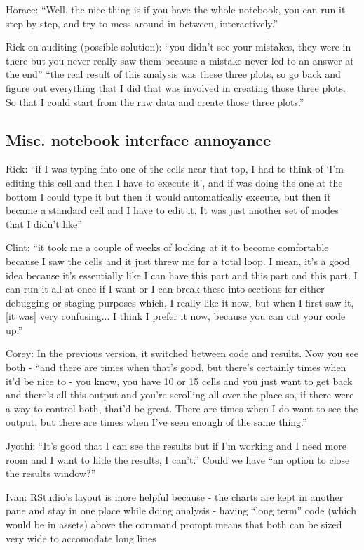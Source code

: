 Horace: ``Well, the nice thing is if you have the whole notebook, you can run it
step by step, and try to mess around in between, interactively.''

Rick on auditing (possible solution): ``you didn't see your mistakes, they were
in there but you never really saw them because a mistake never led to an answer
at the end'' ``the real result of this analysis was these three plots, so go
back and figure out everything that I did that was involved in creating those
three plots. So that I could start from the raw data and create those three
plots.''


\subsection{Misc. notebook interface annoyance}
Rick: ``if I was typing into one of the cells near that top, I had to think of
`I'm editing this cell and then I have to execute it', and if was doing the one
at the bottom I could type it but then it would automatically execute, but then
it became a standard cell and I have to edit it. It was just another set of
modes that I didn't like''

Clint: ``it took me a couple of weeks of looking at it to become comfortable
because I saw the cells and it just threw me for a total loop. I mean, it's a
good idea because it's essentially like I can have this part and this part and
this part. I can run it all at once if I want or I can break these into sections
for either debugging or staging purposes which, I really like it now, but when I
first saw it, [it was] very confusing... I think I prefer it now, because you
can cut your code up.''

Corey: In the previous version, it switched between code and results. Now you
see both - ``and there are times when that's good, but there's certainly times
when it'd be nice to - you know, you have 10 or 15 cells and you just want to
get back and there's all this output and you're scrolling all over the place so,
if there were a way to control both, that'd be great. There are times when I do
want to see the output, but there are times when I've seen enough of the same
thing.''

Jyothi: ``It's good that I can see the results but if I'm working and I need
more room and I want to hide the results, I can't.'' Could we have ``an option
to close the results window?''

Ivan: RStudio's layout is more helpful because - the charts are kept in another
pane and stay in one place while doing analysis - having ``long term'' code
(which would be in assets) above the command prompt means that both can be sized
very wide to accomodate long lines

